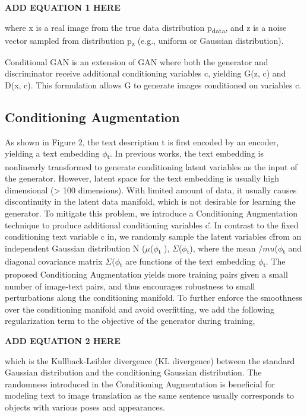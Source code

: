 \documentclass[a4paper,12pt,oneside]{article}
\begin{document}
\textbf{ADD EQUATION 1 HERE}

where x is a real image from the true data distribution p\textsubscript{data}, and z is a noise vector sampled from distribution p\textsubscript{z} (e.g., uniform or Gaussian distribution). 

Conditional GAN is an extension of GAN where both the generator and discriminator receive additional conditioning variables c, yielding G(z, c) and D(x, c). This formulation allows G to generate images conditioned on variables c. 

\subsection{Conditioning Augmentation}
As shown in Figure 2, the text description t is first encoded by an encoder,
yielding a text embedding $\phi$\textsubscript{t}. In previous works, the 
text embedding is nonlinearly transformed to generate conditioning latent 
variables as the input of the generator. However, latent space for the text 
embedding is usually high dimensional (> 100 dimensions). With limited 
amount of data, it usually causes discontinuity in the latent data manifold, 
which is not desirable for learning the generator. To mitigate this 
problem, we introduce a Conditioning Augmentation technique to produce 
additional conditioning variables c\^. In contrast to the fixed conditioning 
text variable c in, we randomly sample the latent variables c\^ 
from an independent Gaussian distribution N 
($\mu$($\phi$\textsubscript{t} ), 
$\Sigma$($\phi$\textsubscript{t}), 
where the mean $/mu$($\phi$\textsubscript{t} and diagonal covariance 
matrix $\Sigma$($\phi$\textsubscript{t}  are functions of the text
embedding $\phi$\textsubscript{t}. The proposed Conditioning Augmentation 
yields more training pairs given a small number of image-text pairs, and 
thus encourages robustness to small perturbations along the conditioning 
manifold. To further enforce the smoothness over the conditioning manifold 
and avoid overfitting, we add the following regularization term to the
objective of the generator during training, 

\textbf{ADD EQUATION 2 HERE}

which is the Kullback-Leibler divergence (KL divergence) between the standard Gaussian distribution and the conditioning Gaussian distribution. The randomness introduced in the Conditioning Augmentation is beneficial for modeling text to image translation as the same sentence usually corresponds to objects with various poses and appearances. 
\end{document}
